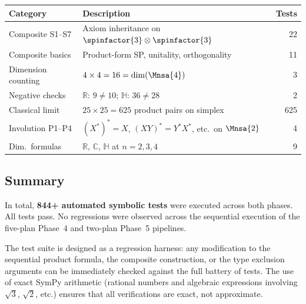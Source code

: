 \begin{center}
\begin{tabular}{@{}llr@{}}
\toprule
Category & Description & Tests \\
\midrule
Composite S1--S7 & Axiom inheritance on $\spinfactor{3}
                    \otimes \spinfactor{3}$ & 22 \\
Composite basics  & Product-form SP, unitality, orthogonality & 11 \\
Dimension counting & $4 \times 4 = 16 = \dim(\Mnsa{4})$ & 3 \\
Negative checks    & $\mathbb{R}$: $9 \neq 10$;
                     $\mathbb{H}$: $36 \neq 28$ & 2 \\
Classical limit    & $25 \times 25 = 625$ product pairs on simplex & 625 \\
Involution P1--P4  & $(X^{*})^{*} = X$, $(XY)^{*} = Y^{*}X^{*}$,
                     etc.\ on $\Mnsa{2}$ & 4 \\
Dim.\ formulas     & $\mathbb{R}$, $\mathbb{C}$, $\mathbb{H}$
                     at $n = 2, 3, 4$ & 9 \\
\bottomrule
\end{tabular}
\end{center}

\subsection{Summary}

In total, \textbf{844+ automated symbolic tests} were executed across
both phases.  All tests pass.  No regressions were observed across the
sequential execution of the five-plan Phase~4 and two-plan Phase~5
pipelines.

The test suite is designed as a regression harness: any modification
to the sequential product formula, the composite construction, or the
type exclusion arguments can be immediately checked against the full
battery of tests.  The use of exact SymPy arithmetic (rational numbers
and algebraic expressions involving $\sqrt{3}$, $\sqrt{2}$, etc.)
ensures that all verifications are exact, not approximate.
